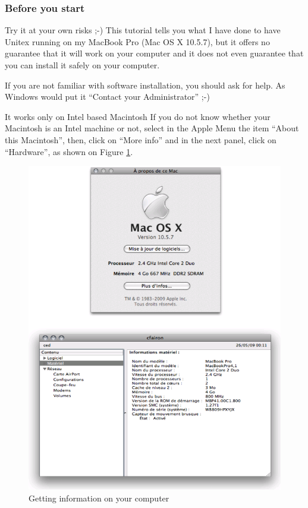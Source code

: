 \subsubsection{Before you start}
\noindent Try it at your own risks ;-) This tutorial tells you what I have done
to have Unitex running on my MacBook Pro (Mac OS X 10.5.7), but it offers no guarantee 
that it will work  on your computer and it does not even guarantee that you can 
install it safely on your computer.

\bigskip
\noindent If you are not familiar with software installation, you should ask for
help. As Windows would put it ``Contact your Administrator'' ;-) 

\bigskip
\noindent It works only on Intel based Macintosh If you do not know whether your 
Macintosh is an Intel machine or not, select in the Apple Menu the item 
``About this Macintosh'', then, click on ``More info'' and in the next panel,
click on ``Hardware'', as shown on Figure \ref{fig-mac1}.

\begin{figure}[!h]
\begin{center}
\includegraphics[width=13cm]{resources/img/fig-mac1.png}
\caption{Getting information on your computer\label{fig-mac1}}
\end{center}
\end{figure}

